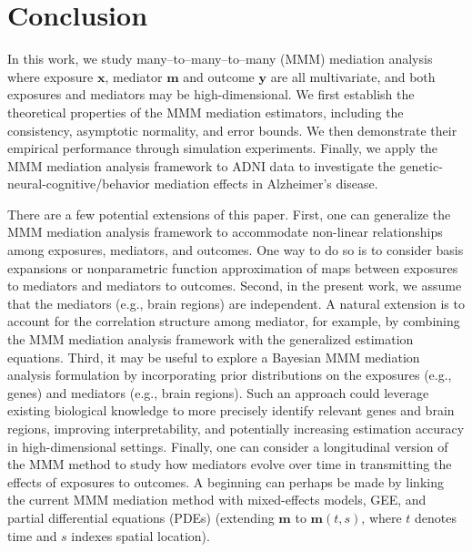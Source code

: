 \documentclass[
  12pt]{article}
\def\M{\mathbf{m}}
\def\X{\mathbf{x}}
\begin{document}
\section{Conclusion}\label{sec-conc}
In this work, we study many--to--many--to--many (MMM) mediation analysis where exposure $\mathbf{x}$, mediator $\mathbf{m}$ and outcome $\mathbf{y}$ are all multivariate, and both exposures and mediators may be high-dimensional. We first establish the theoretical properties of the MMM mediation estimators, including the consistency, asymptotic normality, and error bounds. We then demonstrate their empirical performance through simulation experiments. Finally, we apply the MMM mediation analysis framework to ADNI data to investigate the genetic-neural-cognitive/behavior mediation effects in Alzheimer's disease. 

\medskip

There are a few potential extensions of this paper. First, one can generalize the MMM mediation analysis framework to accommodate non-linear relationships among exposures, mediators, and outcomes. One way to do so is to consider basis expansions or nonparametric function approximation of maps between exposures to mediators and mediators to outcomes.
Second, in the present work, we assume that the mediators (e.g., brain regions) are independent. A natural extension is to account for the correlation structure among mediator, for example, by combining the MMM mediation analysis framework with the generalized estimation equations.
Third, it may be useful to explore a Bayesian MMM mediation analysis formulation by incorporating prior distributions on the exposures (e.g., genes) and mediators (e.g., brain regions). Such an approach could leverage existing biological knowledge to more precisely identify relevant genes and brain regions, improving interpretability, and potentially increasing estimation accuracy in high-dimensional settings.
Finally, one can consider a longitudinal version of the MMM method to study how mediators evolve over time in transmitting the effects of exposures to outcomes. A beginning can perhaps be made by linking the current MMM mediation method with mixed-effects models, GEE, and partial differential equations (PDEs) (extending $\M$ to $\M(t,s)$, where $t$ denotes time and $s$ indexes spatial location).
\end{document}
